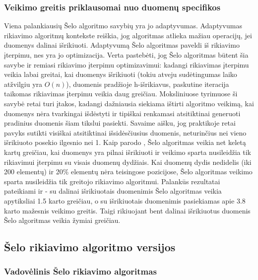 \documentclass{VUMIFInfKursinis}
\begin{document}
\subsubsection{Veikimo greitis priklausomai nuo duomenų specifikos}

Viena palankiausių Šelo algoritmo savybių yra jo adaptyvumas.
Adaptyvumas rikiavimo algoritmų kontekste reiškia, jog algoritmas atlieka mažiau operacijų, jei duomenys dalinai išrikiuoti.
Adaptyvumą Šelo algoritmas paveldi iš rikiavimo įterpimu, nes yra jo optimizacija.
Verta pastebėti, jog Šelo algoritmas būtent šia savybe ir remiasi rikiavimo įterpimu optimizavimui:
kadangi rikiavimas įterpimu veikia labai greitai, kai duomenys išrikiuoti (tokiu atveju sudėtingumas laiko atžvilgiu yra $O(n)$),
duomenis pradžioje h-išrikiavus, paskutine iteracija taikomas rikiavimas įterpimu veikia daug greičiau.
Moksliniuose tyrimuose ši savybė retai turi įtakos, kadangi dažniausia siekiama ištirti algoritmo veikimą, kai duomenys
nėra tvarkingai išdėstyti ir tipiškai renkamasi atsitiktinai generuoti pradinius duomenis šiam tikslui pasiekti.
Savaime aišku, jog praktikoje retai pavyks sutikti visiškai atsitiktinai išsidėsčiusius duomenis, neturinčius nei vieno išrikiuoto posekio ilgesnio nei 1.
Kaip parodo \cite{10.1145/359024.359026}, Šelo algoritmas veikia net keletą kartų greičiau, kai duomenys yra pilnai
išrikiuoti ir veikimo sparta nusileidžia tik rikiavimui įterpimu su visais duomenų dydžiais.
Kai duomenų dydis nedidelis (iki 200 elementų) ir 20\% elementų nėra teisingose pozicijose, Šelo algoritmas veikimo sparta nusileidžia tik greitojo rikiavimo algoritmui.
Palankūs rezultatai pateikiami ir \cite{7280062} - su dalinai išrikiuotais duomenimis Šelo algoritmas veikia apytiksliai 1.5 karto greičiau, o su išrikiuotais
duomenimis pasiekiamas apie 3.8 karto mažesnis veikimo greitis.
Taigi rikiuojant bent dalinai išrikiuotus duomenis Šelo algoritmas veikia žymiai greičiau.





\subsection{Šelo rikiavimo algoritmo versijos}

\subsubsection{Vadovėlinis Šelo rikiavimo algoritmas}
\end{document}
